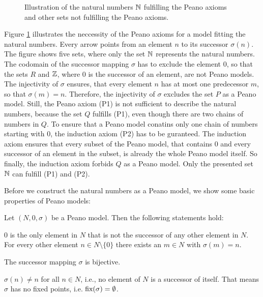 \begin{figure}[ht]

    \caption{Illustration of the natural numbers $\mathbb{N}$ fulfilling the Peano axioms and other sets not fulfilling the Peano axioms.}\label{fig:natural_numbers:peano_model}
\end{figure}

Figure \ref{fig:natural_numbers:peano_model} illustrates the neccessity of the Peano axioms for a model fitting the natural numbers. Every arrow points from an element $n$ to its successor $\sigma(n)$. The figure shows five sets, where only the set $\mathbb{N}$ represents the natural numbers. The codomain of the successor mapping $\sigma$ has to exclude the element $0$, so that the sets $R$ and $\mathbb{Z}$, where $0$ is the successor of an element, are not Peano models. The injectivity of $\sigma$ ensures, that every element $n$ has at most one predecessor $m$, so that $\sigma(m)=n$. Therefore, the injectivity of $\sigma$ excludes the set $P$ as a Peano model. Still, the Peano axiom (P1) is not sufficient to describe the natural numbers, because the set $Q$ fulfills (P1), even though there are two chains of numbers in $Q$. To ensure that a Peano model conatins only one chain of numbers starting with $0$, the induction axiom (P2) has to be guranteed. The induction axiom ensures that every subset of the Peano model, that contains $0$ and every successor of an element in the subset, is already the whole Peano model itself. So finally, the induction axiom forbids $Q$ as a Peano model. Only the presented set $\mathbb{N}$ can fulfill (P1) and (P2).

Before we construct the natural numbers as a Peano model, we show some basic properties of Peano models:

\begin{theorem}\label{theorem:natural_numbers:peano_model_properties}
    Let $(N,0,\sigma)$ be a Peano model. Then the following statements hold:
    \begin{intheoremenumerate}
        \item\label{theorem:natural_numbers:zero_has_no_predecessor} $0$ is the only element in $N$ that is not the successor of any other element in $N$. For every other element $n\in N\setminus\{0\}$ there exists an $m\in N$ with $\sigma(m)=n$.
        \item\label{theorem:natural_numbers:successor_mapping_bijective} The successor mapping $\sigma$ is bijective.
        \item $\sigma(n)\neq n$ for all $n\in N$, i.e.,
        no element of $N$ is a successor of itself. That means $\sigma$ has no fixed points, i.e. $\text{fix}(\sigma)=\emptyset$.
    \end{intheoremenumerate}
\end{theorem}

